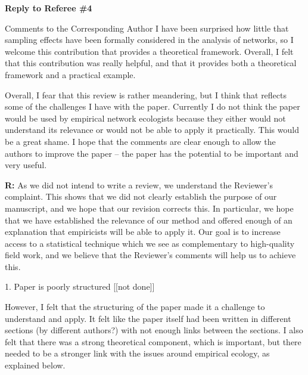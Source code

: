 \documentclass[12pt]{letter}
\newenvironment{refquote}{\bigskip \begin{it}}{\end{it}\smallskip}
\begin{document}
\newpage

{\Large \bf Reply to Referee \#4}

	\begin{refquote}
		Comments to the Corresponding Author
		I have been surprised how little that sampling effects have been formally considered in the analysis of networks, so I welcome this contribution that provides a theoretical framework. Overall, I felt that this contribution was really helpful, and that it provides both a theoretical framework and a practical example.

		Overall, I fear that this review is rather meandering, but I think that reflects some of the challenges I have with the paper. Currently I do not think the paper would be used by empirical network ecologists because they either would not understand its relevance or would not be able to apply it practically. This would be a great shame. I hope that the comments are clear enough to allow the authors to improve the paper – the paper has the potential to be important and very useful.
		\end{refquote}

		\textbf{R:} As we did not intend to write a review, we understand the Reviewer's complaint. This shows that we did not clearly establish the purpose of our manuscript, and we hope that our revision corrects this. In particular, we hope that we have established the relevance of our method and offered enough of an explanation that empiricists will be able to apply it. Our goal is to increase access to a statistical technique which we see as complementary to high-quality field work, and we believe that the Reviewer's comments will help us to achieve this.


	1. Paper is poorly structured [[not done]]

		\begin{refquote}
		However, I felt that the structuring of the paper made it a challenge to understand and apply. It felt like the paper itself had been written in different sections (by different authors?) with not enough links between the sections. I also felt that there was a strong theoretical component, which is important, but there needed to be a stronger link with the issues around empirical ecology, as explained below.
		\end{refquote}
\end{document}
